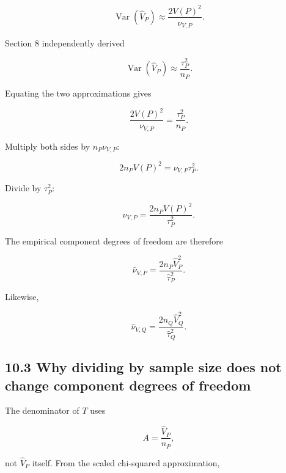 \documentclass[
  11pt]{article}
\begin{document}
\begin{equation}
\operatorname{Var}(\widehat V_P)
\approx\frac{2V(P)^2}{\nu_{V,P}}.
\end{equation}

Section 8 independently derived

\begin{equation}
\operatorname{Var}(\widehat V_P)
\approx\frac{\tau_P^2}{n_P}.
\end{equation}

Equating the two approximations gives

\begin{equation}
\frac{2V(P)^2}{\nu_{V,P}}
=\frac{\tau_P^2}{n_P}.
\end{equation}

Multiply both sides by \(n_P\nu_{V,P}\):

\begin{equation}
2n_PV(P)^2
=\nu_{V,P}\tau_P^2.
\end{equation}

Divide by \(\tau_P^2\):

\begin{equation}
\boxed{
\nu_{V,P}
=\frac{2n_PV(P)^2}{\tau_P^2}.
}
\end{equation}

The empirical component degrees of freedom are therefore

\begin{equation}
\boxed{
\widehat\nu_{V,P}
=\frac{2n_P\widehat V_P^2}{\widehat\tau_P^2}.
}
\end{equation}

Likewise,

\begin{equation}
\boxed{
\widehat\nu_{V,Q}
=\frac{2n_Q\widehat V_Q^2}{\widehat\tau_Q^2}.
}
\end{equation}

\subsection{10.3 Why dividing by sample size does not change component
degrees of
freedom}\label{why-dividing-by-sample-size-does-not-change-component-degrees-of-freedom}

The denominator of \(T\) uses

\begin{equation}
A=\frac{\widehat V_P}{n_P},
\end{equation}

not \(\widehat V_P\) itself. From the scaled chi-squared approximation,
\end{document}
